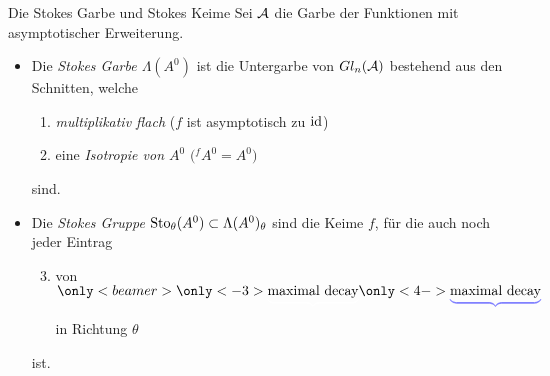 \begin{frame}{Die Stokes Garbe und Stokes Keime}
  Sei $\mathcal{A}$ die Garbe der Funktionen mit asymptotischer Erweiterung.
  \begin{defn}
    \begin{itemize}
    \item Die \emph{Stokes Garbe \boldmath$\Lambda(A^0)$} ist die Untergarbe
      von $Gl_n(\mathcal{A})$ bestehend aus den Schnitten, welche
      \begin{enumerate}
      \item\emph{multiplikativ flach} ($f$ ist asymptotisch zu $\operatorname{id}$)
      \item<2-> eine \emph{Isotropie von \boldmath$A^0$} $\bigl({}^fA^0=A^0\bigr)$
      \end{enumerate}
      sind.
    \item<3-> Die \emph{Stokes Gruppe} $\operatorname{Sto}_\theta(A^0)\subset\Lambda(A^0)_\theta$
      sind die Keime $f$, für die auch noch jeder Eintrag
      \begin{enumerate}
        \setcounter{enumi}{2}
      \item von
        \emph{$\underset{\tikzmarkt{e2}}{%
            \only<beamer>{
              \only<-3>{%
                \textcolor{white}{\underbrace{\text{%
                      \textcolor{black}{maximal decay}}}}
              }
            }
            \only<4->{%
              \textcolor{blue!50!white}{\underbrace{\text{%
                    \textcolor{black}{maximal decay}}}}
            }
          }$
        }
        in Richtung $\theta$
      \end{enumerate}
      ist.
    \end{itemize}
  \end{defn}
\end{frame}

